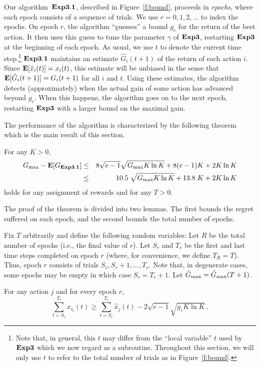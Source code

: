 \documentclass[12pt]{article}
\newcommand{\E}{\mbox{\rm\bf E}}
\newcommand{\Aest}{{\bf Exp3}}
\newcommand{\Abound}{{\bf Exp3.1}}
\newcommand{\x}[2]{x_{#1}({#2})}
\renewcommand{\i}[1]{i_{#1}}
\newcommand{\xit}{\x{\i{t}}{t}}
\newcommand{\Gh}[1]{\hat{G}_{#1}}
\newcommand{\Ghbest}{\hat{G}_{\rm max}}
\newcommand{\Gbest}{G_{\rm max}}
\newcommand{\hx}[2]{\hat{x}_{#1}(#2)}
\begin{document}
Our algorithm~$\Abound$, described in Figure~\ref{f:bound},
proceeds in {\em epochs}, where each epoch consists of a sequence of
trials. We use $r=0,1,2,\ldots$ to index the epochs.
On epoch $r$, the algorithm ``guesses'' a bound $g_r$ for the 
return of the best action. It then uses this guess
to tune the parameter $\gamma$ of $\Aest$, restarting
$\Aest$ at the beginning of each epoch.
As usual, we use $t$ to denote the current time step.\footnote{%
Note that, in general, this $t$ may differ from the ``local variable''
$t$ used by $\Aest$ which we now regard as a subroutine.
Throughout this section, we will only use $t$ to refer to the total
number of trials as in Figure~\ref{f:bound}.%
}
$\Abound$ maintains an estimate $\Gh{i}(t+1)$ of the return of each action $i$.
Since $\E[\hx{i}{t}] = \x{i}{t}$, this estimate will be unbiased
in the sense that $\E[\Gh{i}(t+1)] = G_i(t+1)$ for all $i$ and $t$.
Using these estimates, the algorithm detects (approximately) when the
actual gain of some action has advanced beyond $g_r$.
When this happens, the algorithm goes on to the next epoch,
restarting $\Aest$ with a larger bound on the maximal gain.

The performance of the algorithm is characterized by the following
theorem which is the main result of this section.

%
\begin{theorem}
\label{th:Abound}
For any $K > 0$,
\begin{eqnarray*}
        \Gbest - \E[G_{\Abound}]
&\leq&
8\sqrt{e-1}\sqrt{ \Gbest K \ln K}
+
8(e-1)K
+
2 K \ln K\\
&\leq&
10.5\;\sqrt{ \Gbest K \ln K}
+
13.8\;K
+
2 K \ln K
\end{eqnarray*}
holds for any assignment of rewards and for any $T > 0$.
\end{theorem}
%
The proof of the theorem is divided into two lemmas.  
The first bounds the regret suffered on each epoch, and the second
bounds the total number of epochs.

Fix $T$ arbitrarily and define the following random variables:
Let $R$ be the total number of epochs (i.e., the final value of $r$).
Let $S_r$ and $T_r$ be the first and last time steps completed on epoch
$r$ (where, for convenience, we define $T_R = T$).
Thus, epoch $r$ consists of trials $S_r,S_r+1,\ldots,T_r$.
Note that, in degenerate cases, some epochs may be empty in which case
$S_r = T_r + 1$. Let $\Ghbest = \Ghbest(T+1)$.
%
\begin{lemma} \label{lemma:bound-per-round}
For any action $j$ and for every epoch $r$,
\[
\sum_{t=S_r}^{T_r} \xit
\geq
\sum_{t=S_r}^{T_r} \hx{j}{t}
- 2 \sqrt{e-1} \sqrt{g_r K \ln K}~.
\]
\end{lemma}
\end{document}
